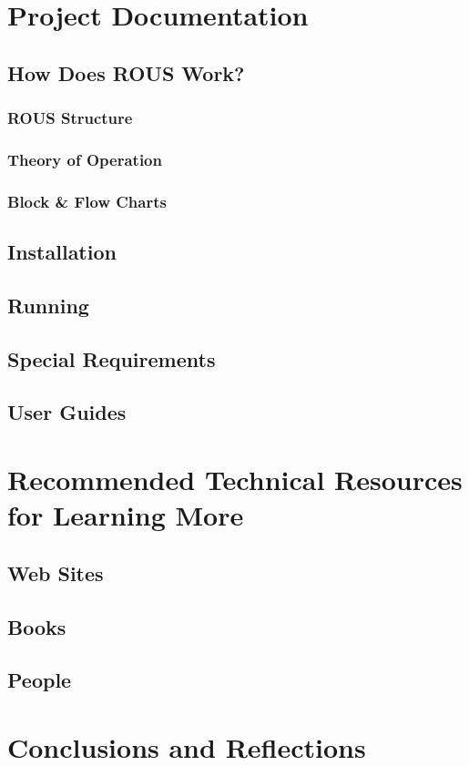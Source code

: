 \documentclass[draftclsnofoot, onecolumn, compsoc, 10pt]{IEEEtran}
\begin{document}
\section{Project Documentation}
\subsection{How Does ROUS Work?}
\subsubsection{ROUS Structure}
\subsubsection{Theory of Operation}
\subsubsection{Block \& Flow Charts}
\subsection{Installation}
\subsection{Running}
\subsection{Special Requirements}
\subsection{User Guides}
\section{Recommended Technical Resources for Learning More}
\subsection{Web Sites}
\subsection{Books}
\subsection{People}
\section{Conclusions and Reflections}
\end{document}
